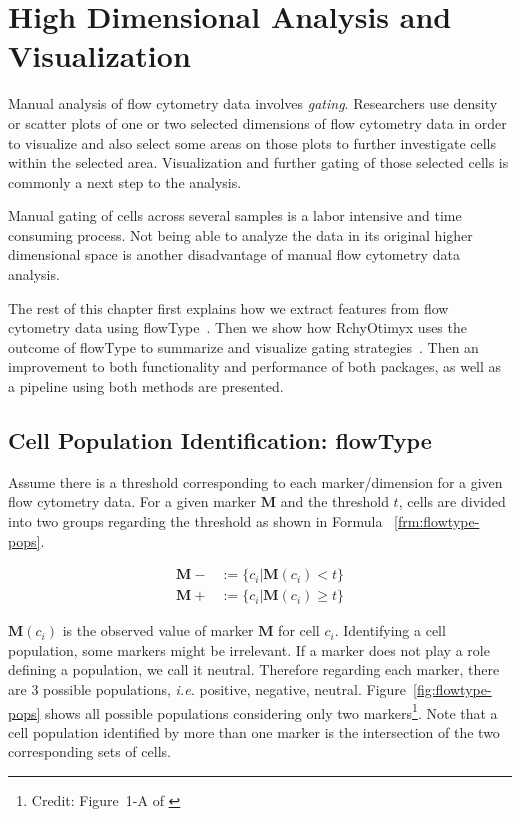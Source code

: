 \section{High Dimensional Analysis and Visualization}
Manual analysis of flow cytometry data involves \emph{gating}. Researchers use density or scatter plots of one or two selected dimensions  of flow cytometry data in order to visualize and also select some areas on those plots to further investigate cells within the selected area. Visualization and further gating of those selected cells is commonly a next step to the analysis.

Manual gating of cells across several samples is a labor intensive and time consuming process. Not being able to analyze the data in its original higher dimensional space is another disadvantage of manual flow cytometry data analysis.

The rest of this chapter first explains how we extract features from flow cytometry data using flowType~\cite{Aghaeepour2012}. Then we show how RchyOtimyx uses the outcome of flowType to summarize and visualize gating strategies~\cite{Aghaeepour2012a}. Then an improvement to both functionality and performance of both packages, as well as a pipeline using both methods are presented.

\subsection{Cell Population Identification: flowType}
Assume there is a threshold corresponding to each marker/dimension for a given flow cytometry data. For a given marker $\mathbf{M}$ and the threshold $t$, cells are divided into two groups regarding the threshold as shown in Formula ~\ref{frm:flowtype-pops}.

\begin{align}
  \mathbf{M-} &:= \{c_i | \mathbf{M}(c_i) < t \} \nonumber \\  
  \mathbf{M+} &:= \{c_i | \mathbf{M}(c_i) \ge t \}
  \label{frm:flowtype-pops}
\end{align}

$\mathbf{M}(c_i)$ is the observed value of marker $\mathbf{M}$ for cell $c_i$. Identifying a cell population, some markers might be irrelevant. If a marker does not play a role defining a population, we call it neutral. Therefore regarding each marker, there are $3$ possible populations, \emph{i.e.} positive, negative, neutral. Figure~\ref{fig:flowtype-pops} shows all possible populations considering only two markers\footnote{Credit: Figure~1-A of \cite{Aghaeepour2012}}. Note that a cell population identified by more than one marker is the intersection of the two corresponding sets of cells.


